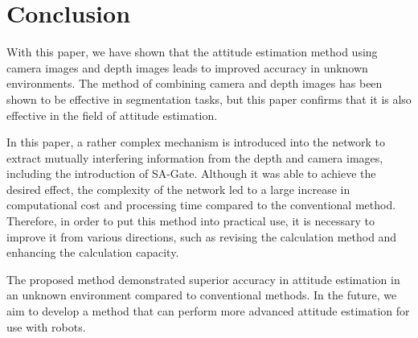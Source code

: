 \section{Conclusion}
With this paper, we have shown that the attitude estimation method using camera images and depth images leads to improved accuracy in unknown environments. The method of combining camera and depth images has been shown to be effective in segmentation tasks, but this paper confirms that it is also effective in the field of attitude estimation.



In this paper, a rather complex mechanism is introduced into the network to extract mutually interfering information from the depth and camera images, including the introduction of SA-Gate. Although it was able to achieve the desired effect, the complexity of the network led to a large increase in computational cost and processing time compared to the conventional method. Therefore, in order to put this method into practical use, it is necessary to improve it from various directions, such as revising the calculation method and enhancing the calculation capacity.


The proposed method demonstrated superior accuracy in attitude estimation in an unknown environment compared to conventional methods. In the future, we aim to develop a method that can perform more advanced attitude estimation for use with robots.

